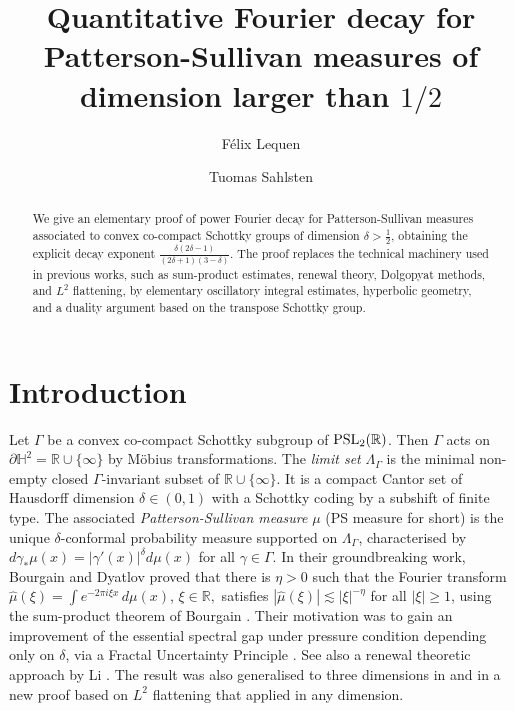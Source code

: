 \documentclass[12pt]{amsart}
\title{Quantitative Fourier decay for Patterson-Sullivan measures of dimension larger than $1/2$}
\author{F\'{e}lix Lequen}
\author{Tuomas Sahlsten}
\newcommand{\R}{\mathbb{R}}
\newcommand*\abs[1]{
	\left|#1\right|
}
\theoremstyle{definition}
\renewcommand{\geq}{\geqslant}
\begin{document}
\begin{abstract}
We give an elementary proof of power Fourier decay for Patterson-Sullivan measures associated to convex co-compact Schottky groups of dimension $\delta>\frac12$, obtaining the explicit decay exponent $\frac{\delta(2\delta - 1)}{(2\delta + 1)(3 - \delta)}$. The proof replaces the technical machinery used in previous works, such as sum-product estimates, renewal theory, Dolgopyat methods, and $L^2$ flattening, by elementary oscillatory integral estimates, hyperbolic geometry, and a duality argument based on the transpose Schottky group.
\end{abstract}

\maketitle




\section{Introduction}

Let $\Gamma$ be a convex co-compact Schottky subgroup of ${\rm PSL}_2(\mathbb{R})$. Then $\Gamma$ acts on 
$\partial \mathbb{H}^2=\R\cup\{\infty\}$ by M\"obius transformations.
The \emph{limit set} $\Lambda_\Gamma$ is the minimal non-empty closed $\Gamma$-invariant subset of $\R\cup\{\infty\}$. It is a compact Cantor set of Hausdorff dimension $\delta\in(0,1)$ with a Schottky coding by a subshift of finite type. The associated \textit{Patterson-Sullivan measure} $\mu$ (PS measure for short) is the unique $\delta$-conformal probability measure supported on $\Lambda_\Gamma$, characterised by
$
d\gamma_\ast\mu(x) = \abs{\gamma'(x)}^\delta d\mu(x)
$ for all $\gamma\in\Gamma$. In their groundbreaking work, Bourgain and Dyatlov \cite{BD} proved that there is $\eta > 0$ such that the Fourier transform $
\widehat{\mu}(\xi) = \int e^{-2\pi i\xi x}\,d\mu(x)$, $\xi\in\R,$
satisfies $|\widehat{\mu}(\xi)| \lesssim |\xi|^{-\eta}$ for all $|\xi| \geq 1$, using the sum-product theorem of Bourgain \cite{Bourgain}. Their motivation was to gain an improvement of the essential spectral gap under pressure condition depending only on $\delta$, via a Fractal Uncertainty Principle \cite{DyatlovZahl}. See also a renewal theoretic approach by Li \cite{LiStationary}. The result was also generalised to three dimensions in \cite{LNP} and in \cite{BKS} a new proof based on $L^2$ flattening that applied in any dimension.
\end{document}
